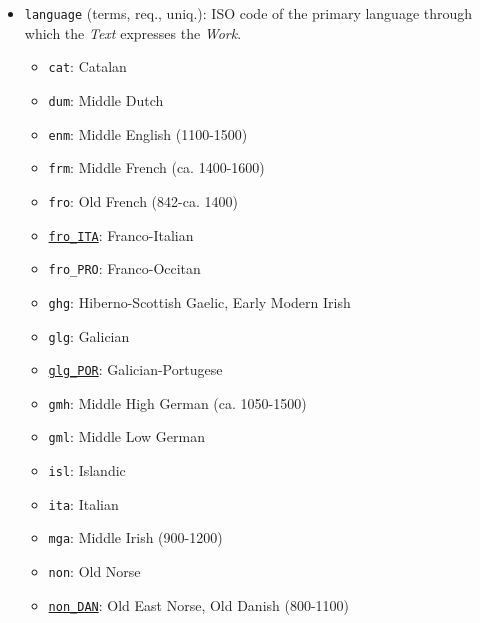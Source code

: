\begin{itemize}
\begin{multicols}{2}
\begin{itemize}
\begin{itemize}
                \end{itemize}
            \item Relevant to Middle English, Middle Irish, Middle Welsh traditions
            \begin{itemize}
                \item \texttt{romance}
            \end{itemize}
            \item Relevant to Middle High German tradition
        \end{itemize}
    \end{multicols}
    \item \texttt{language} (terms, req., uniq.): ISO code of the primary language through which the \textit{Text} expresses the \textit{Work}.
    \begin{multicols}{2}
        \begin{itemize}
            \item \texttt{cat}: Catalan
            \item \texttt{dum}: Middle Dutch
            \item \texttt{enm}: Middle English (1100-1500)
            \item \texttt{frm}: Middle French (ca. 1400-1600)
            \item \texttt{fro}: Old French (842-ca. 1400)
            \item \href{https://www.wikidata.org/wiki/Q54879035}{\texttt{fro\_ITA}}: Franco-Italian
            \item \texttt{fro\_PRO}: Franco-Occitan
            \item \texttt{ghg}: Hiberno-Scottish Gaelic, Early Modern Irish
            \item \texttt{glg}: Galician
            \item \href{https://www.wikidata.org/wiki/Q1072111}{\texttt{glg\_POR}}: Galician-Portugese
            \item \texttt{gmh}: Middle High German (ca. 1050-1500)
            \item \texttt{gml}: Middle Low German
            \item \texttt{isl}: Islandic
            \item \texttt{ita}: Italian
            \item \texttt{mga}: Middle Irish (900-1200)
            \item \texttt{non}: Old Norse
            \item \href{https://www.wikidata.org/wiki/Q12330003}{\texttt{non\_DAN}}: Old East Norse, Old Danish (800-1100)

\end{itemize}
\end{multicols}
\end{itemize}
